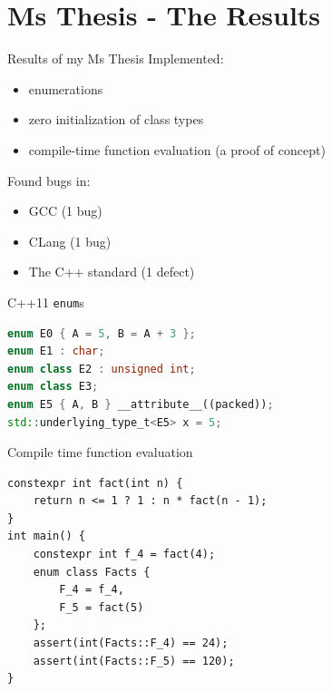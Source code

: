 \documentclass[11pt]{beamer}
\begin{document}
\section{Ms Thesis - The Results}

\begin{frame}{Results of my Ms Thesis}
Implemented:
\begin{itemize}
\pause \item enumerations
\pause \item zero initialization of class types
\pause \item compile-time function evaluation (a proof of concept)
\end{itemize}
\pause
Found bugs in:
\begin{itemize}
\pause \item GCC (1 bug)
\pause \item CLang (1 bug)
\pause \item The C++ standard (1 defect)
\end{itemize}
\end{frame}


\begin{frame}[fragile]{C++11 \texttt{enum}s}
\begin{lstlisting}[language=C++]
enum E0 { A = 5, B = A + 3 };
enum E1 : char;
enum class E2 : unsigned int;
enum class E3;
enum E5 { A, B } __attribute__((packed));
std::underlying_type_t<E5> x = 5;
\end{lstlisting}
\end{frame}

\begin{frame}[fragile]{Compile time function evaluation}
\begin{lstlisting}
constexpr int fact(int n) {
	return n <= 1 ? 1 : n * fact(n - 1);
}
int main() {
	constexpr int f_4 = fact(4);
	enum class Facts {
		F_4 = f_4,
		F_5 = fact(5)
	};
	assert(int(Facts::F_4) == 24);
	assert(int(Facts::F_5) == 120);
}
\end{lstlisting}
\end{frame}
\end{document}
